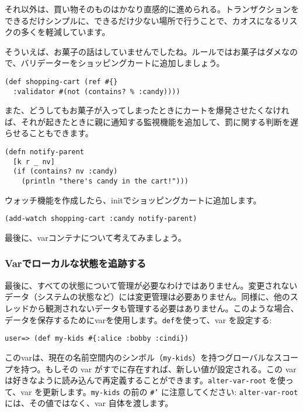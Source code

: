 それ以外は、買い物そのものはかなり直感的に進められる。トランザクションをできるだけシンプルに、できるだけ少ない場所で行うことで、カオスになるリスクの多くを軽減しています。

そういえば、お菓子の話はしていませんでしたね。ルールではお菓子はダメなので、バリデーターをショッピングカートに追加しましょう。


\begin{lstlisting}[numbers=none]
(def shopping-cart (ref #{}
  :validator #(not (contains? % :candy))))
\end{lstlisting}

また、どうしてもお菓子が入ってしまったときにカートを爆発させたくなければ、それが起きたときに親に通知する監視機能を追加して、罰に関する判断を遅らせることもできます。


\begin{lstlisting}[numbers=none]
(defn notify-parent
  [k r _ nv]
  (if (contains? nv :candy)
    (println "there's candy in the cart!")))
\end{lstlisting}

ウォッチ機能を作成したら、initでショッピングカートに追加します。


\begin{lstlisting}[numbers=none]
(add-watch shopping-cart :candy notify-parent)
\end{lstlisting}

最後に、varコンテナについて考えてみましょう。





\subsubsection{Varでローカルな状態を追跡する}

最後に、すべての状態について管理が必要なわけではありません。変更されないデータ（システムの状態など）には変更管理は必要ありません。同様に、他のスレッドから観測されないデータも管理する必要はありません。このような場合、データを保存するためにvarを使用します。\texttt{def}を使って、var を設定する:


\begin{lstlisting}[numbers=none]
user=> (def my-kids #{:alice :bobby :cindi})
\end{lstlisting}

このvarは、現在の名前空間内のシンボル（\texttt{my-kids}）を持つグローバルなスコープを持つ。もしその var がすでに存在すれば、新しい値が設定される。この var は好きなように読み込んで再定義することができます。\texttt{alter-var-root} を使って、var を更新します。\texttt{my-kids} の前の \texttt{#'} に注意してください: \texttt{alter-var-root} には、その値ではなく、var 自体を渡します。


